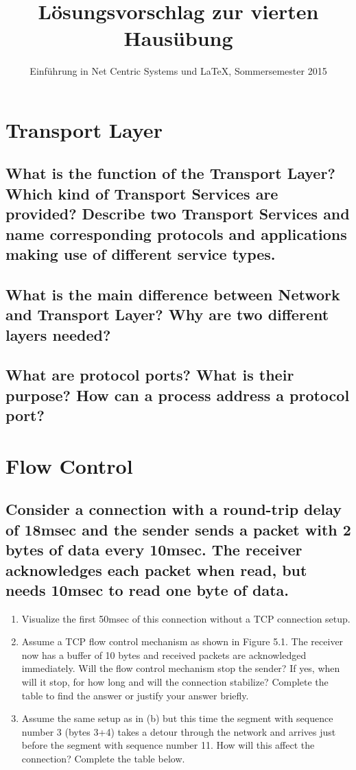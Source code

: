 \documentclass[a4paper,
			llpt,
			solution,
			accentcolor=tud2d,
			colorbacktitle
			]
			{tudexercise}
\title{Lösungsvorschlag zur vierten Hausübung}
\subtitle{Einführung in Net Centric Systems und \LaTeX, Sommersemester 2015}
\begin{document}
\maketitle
\section{Transport Layer}
\subsection{What is the function of the Transport Layer? Which kind of Transport Services are provided? Describe two Transport Services and name corresponding protocols and applications making use of different service types.}
\subsection{What is the main difference between Network and Transport Layer? Why are two different layers needed?}
\subsection{What are protocol ports? What is their purpose? How can a process address a protocol port?}
\section{Flow Control}
\subsection{Consider a connection with a round-trip delay of 18msec and the sender sends a packet with 2 bytes of data every 10msec. The receiver acknowledges each packet when read, but needs 10msec to read one byte of data.}
\begin{enumerate}
\item Visualize the first 50msec of this connection without a TCP connection setup.
\item Assume a TCP flow control mechanism as shown in Figure 5.1. The receiver now has a buffer of 10 bytes and received packets are acknowledged immediately. Will the flow control mechanism stop the sender? If yes, when will it stop, for how long and will the connection stabilize? Complete the table to find the answer or justify your answer briefly.
\item Assume the same setup as in (b) but this time the segment with sequence number 3 (bytes 3+4) takes a detour through the network and arrives just before the segment with sequence number 11. How will this affect the connection? Complete the table below.
\end{enumerate}
\end{document}
